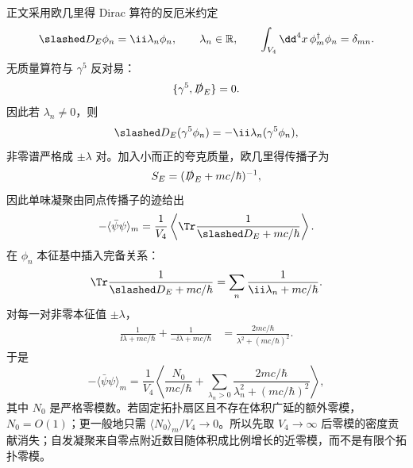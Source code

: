 \begin{derivation}
正文采用欧几里得 Dirac 算符的反厄米约定
\begin{equation*}
 \slashed D_E\phi_n=\ii\lambda_n\phi_n,
 \qquad \lambda_n\in\mathbb R,
 \qquad
 \int_{V_4}\dd^4 x\,\phi_m^\dagger\phi_n=\delta_{mn}.
\end{equation*}
无质量算符与 $\gamma^5$ 反对易：
\begin{equation*}
 \{\gamma^5,\slashed D_E\}=0.
\end{equation*}
因此若 $\lambda_n\neq0$，则
\begin{equation*}
 \slashed D_E(\gamma^5\phi_n)
 =-\ii\lambda_n(\gamma^5\phi_n),
\end{equation*}
非零谱严格成 $\pm\lambda$ 对。加入小而正的夸克质量，欧几里得传播子为
\begin{equation*}
 S_E=(\slashed D_E+mc/\hbar)^{-1},
\end{equation*}
因此单味凝聚由同点传播子的迹给出
\begin{equation*}
 -\langle\bar\psi\psi\rangle_m
 =\frac1{V_4}
 \left\langle\Tr\frac1{\slashed D_E+mc/\hbar}\right\rangle.
\end{equation*}
在 $\phi_n$ 本征基中插入完备关系：
\begin{equation*}
 \Tr\frac1{\slashed D_E+mc/\hbar}
 =\sum_n\frac1{\ii\lambda_n+mc/\hbar}.
\end{equation*}
对每一对非零本征值 $\pm\lambda$，
\begin{align*}
 \frac1{\ii\lambda+mc/\hbar}
 +\frac1{-\ii\lambda+mc/\hbar}
 &=\frac{2mc/\hbar}{\lambda^2+(mc/\hbar)^2}.
\end{align*}
于是
\begin{equation*}
 -\langle\bar\psi\psi\rangle_m
 =\frac1{V_4}\left\langle
 \frac{N_0}{mc/\hbar}
 +\sum_{\lambda_n>0}
 \frac{2mc/\hbar}{\lambda_n^2+(mc/\hbar)^2}
 \right\rangle,
\end{equation*}
其中 $N_0$ 是严格零模数。若固定拓扑扇区且不存在体积广延的额外零模，$N_0=O(1)$；更一般地只需 $\langle N_0\rangle_m/V_4\to0$。所以先取 $V_4\to\infty$ 后零模的密度贡献消失；自发凝聚来自零点附近数目随体积成比例增长的近零模，而不是有限个拓扑零模。


\end{derivation}
